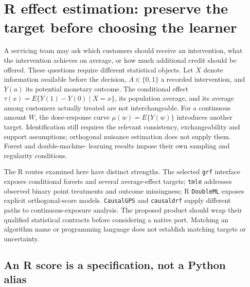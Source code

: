 \section{R effect estimation: preserve the target before choosing the learner}
\label{exec20:rfx-scope}

A servicing team may ask which customers should receive an intervention, what
the intervention achieves on average, or how much additional credit should be
offered. These questions require different statistical objects. Let $X$ denote
information available before the decision, $A\in\{0,1\}$ a recorded intervention,
and $Y(a)$ its potential monetary outcome. The conditional effect
$\tau(x)=E\{Y(1)-Y(0)\mid X=x\}$, its population average, and its average among
customers actually treated are not interchangeable. For a continuous amount $W$,
the dose-response curve $\mu(w)=E\{Y(w)\}$ introduces another target. Identification
still requires the relevant consistency, exchangeability and support assumptions;
orthogonal nuisance estimation does not supply them. Forest and double-machine-
learning results impose their own sampling and regularity conditions.
\citep{dml2018,grf2018}

The R routes examined here have distinct strengths. The selected \texttt{grf}
interface exposes conditional forests and several average-effect targets;
\texttt{tmle} addresses observed binary point treatments and outcome missingness;
R \texttt{DoubleML} exposes explicit orthogonal-score models. \texttt{CausalGPS}
and \texttt{causaldrf} supply different paths to continuous-exposure analysis.
The proposed product should wrap their qualified statistical contracts before
considering a native port. Matching an algorithm name or programming language
does not establish matching targets or uncertainty.
\citep{exec13_grf_rpath,exec20_rfx_tmle,exec20_rfx_doubleml_r,
exec20_rfx_causalgps,exec20_rfx_causaldrf}

\subsection{An R score is a specification, not a Python alias}

